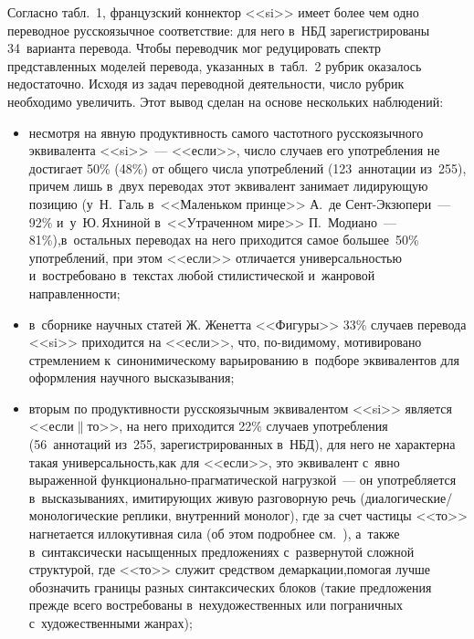\begin{multicols}{2}
  
  Согласно табл.~1, французский коннектор <<si>> имеет более чем одно 
переводное русскоязычное соответствие: для него в~НБД зарегистрированы 
34~варианта перевода. Чтобы переводчик мог редуцировать спектр 
представленных моделей перевода, указанных в~табл.~2 рубрик оказалось 
недостаточно. Исходя из задач переводной деятельности, число рубрик 
необходимо увеличить. Этот вывод сделан на основе нескольких 
наблюдений:
  \begin{itemize}
  \item несмотря на явную продуктивность самого час\-тот\-но\-го 
русскоязычного эквивалента <<si>>~--- <<если>>, число случаев его 
употребления не достигает 50\% (48\%) от общего числа употреблений 
(123~аннотации из~255), причем лишь в~двух переводах этот эквивалент 
занимает ли\-ди\-ру\-ющую позицию (у~Н.~Галь в~<<Маленьком принце>> 
А.~де Сент-Эк\-зю\-пе\-ри~--- 92\% и~у~Ю.\,Яхниной в~<<Утраченном 
мире>> П.~Модиано~--- 81\%),\linebreak в~остальных переводах на него приходится 
самое большее~50\% употреблений, при этом <<если>> отличается 
универсальностью и~востребовано в~текс\-тах любой стилистической 
и~\mbox{жан\-ро\-вой} на\-прав\-лен\-ности;
  \item  в~сборнике научных статей Ж. Женетта <<Фигуры>> 33\% случаев 
перевода <<si>> приходится на <<если>>, что, по-ви\-ди\-мо\-му, 
мотивировано стремлением к~синонимическому варьированию в~подборе 
эквивалентов для оформления научного высказывания;
  \item  вторым по продуктивности русскоязычным эквивалентом <<si>> 
является <<если$\|$то>>, на него приходится 22\% случаев употребления 
(56~аннотаций из~255, зарегистрированных в~НБД), для него не характерна 
такая универсальность,\linebreak как для <<если>>, это эквивалент с~явно выраженной  
функ\-цио\-наль\-но-праг\-ма\-ти\-че\-ской нагрузкой~--- он употребляется 
в~высказываниях, \mbox{имитирующих} живую разговорную речь  
(диа\-ло\-ги\-че\-ские/мо\-но\-ло\-ги\-че\-ские реплики, внутренний монолог), 
где за счет частицы <<то>> нагнетается иллокутивная сила (об этом 
подробнее см.~\cite{20-n}), а~также в~синтаксически насыщенных\linebreak 
предложениях с~развернутой слож\-ной структурой, где <<то>> служит 
средством демаркации,\linebreak помогая лучше обозначить границы разных 
синтаксических блоков (такие предложения прежде всего востребованы 
в~нехудожественных или пограничных с~художественными жан\-рах);

\end{itemize}
\end{multicols}
